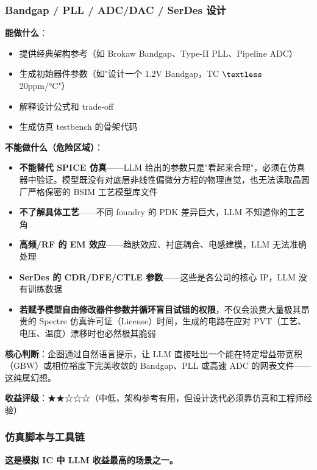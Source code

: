 \documentclass[UTF8,a4paper,10pt,oneside]{ctexart}
\begin{document}
\subsubsection{Bandgap / PLL / ADC/DAC / SerDes 设计}

\textbf{能做什么}：
\begin{itemize}
    \item 提供经典架构参考（如 Brokaw Bandgap、Type-II PLL、Pipeline ADC）
    \item 生成初始器件参数（如"设计一个 1.2V Bandgap，TC $\textless$ 20ppm/°C"）
    \item 解释设计公式和 trade-off
    \item 生成仿真 testbench 的骨架代码
\end{itemize}

\textbf{不能做什么（危险区域）}：
\begin{itemize}
    \item \textbf{不能替代 SPICE 仿真}——LLM 给出的参数只是"看起来合理"，必须在仿真器中验证。模型既没有对底层非线性偏微分方程的物理直觉，也无法读取晶圆厂严格保密的 BSIM 工艺模型库文件
    \item \textbf{不了解具体工艺}——不同 foundry 的 PDK 差异巨大，LLM 不知道你的工艺角
    \item \textbf{高频/RF 的 EM 效应}——趋肤效应、衬底耦合、电感建模，LLM 无法准确处理
    \item \textbf{SerDes 的 CDR/DFE/CTLE 参数}——这些是各公司的核心 IP，LLM 没有训练数据
    \item \textbf{若赋予模型自由修改器件参数并循环盲目试错的权限}，不仅会浪费大量极其昂贵的 Spectre 仿真许可证（License）时间，生成的电路在应对 PVT（工艺、电压、温度）漂移时也必然极其脆弱
\end{itemize}

\textbf{核心判断}：企图通过自然语言提示，让 LLM 直接吐出一个能在特定增益带宽积（GBW）或相位裕度下完美收敛的 Bandgap、PLL 或高速 ADC 的网表文件——这纯属幻想。

\textbf{收益评级}：★★☆☆☆（中低，架构参考有用，但设计迭代必须靠仿真和工程师经验）

\subsubsection{仿真脚本与工具链}

\textbf{这是模拟 IC 中 LLM 收益最高的场景之一。}
\end{document}
